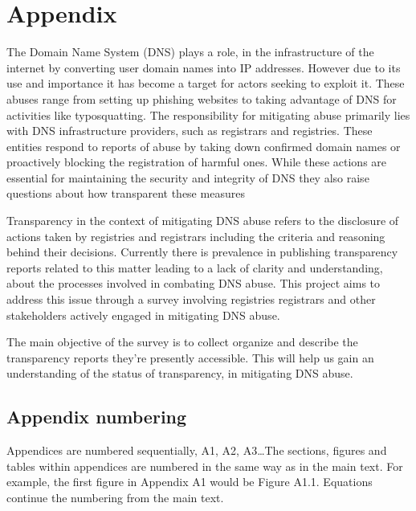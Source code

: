 \chapter{Appendix}
The Domain Name System (DNS) plays a role, in the infrastructure of the internet by converting user domain names into IP addresses. However due to its use and importance it has become a target for actors seeking to exploit it. These abuses range from setting up phishing websites to taking advantage of DNS for activities like typosquatting. The responsibility for mitigating abuse primarily lies with DNS infrastructure providers, such as registrars and registries. These entities respond to reports of abuse by taking down confirmed domain names or proactively blocking the registration of harmful ones. While these actions are essential for maintaining the security and integrity of DNS they also raise questions about how transparent these measures 

Transparency in the context of mitigating DNS abuse refers to the disclosure of actions taken by registries and registrars including the criteria and reasoning behind their decisions. Currently there is prevalence in publishing transparency reports related to this matter leading to a lack of clarity and understanding, about the processes involved in combating DNS abuse. This project aims to address this issue through a survey involving registries registrars and other stakeholders actively engaged in mitigating DNS abuse.

The main objective of the survey is to collect organize and describe the transparency reports they're presently accessible. This will help us gain an understanding of the status of transparency, in mitigating DNS abuse.

\section{Appendix numbering}
Appendices are numbered sequentially, A1, A2, A3\ldots The sections, figures and tables within appendices are numbered in the same way as in the main text. For example, the first figure in Appendix A1 would be Figure A1.1. Equations continue the numbering from the main text.
